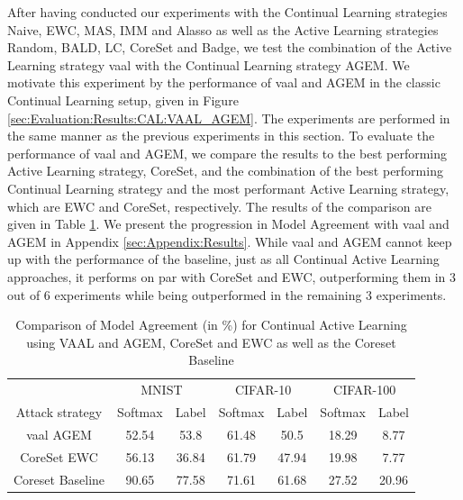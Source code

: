 After having conducted our experiments with the Continual Learning strategies Naive, EWC, MAS, IMM and Alasso as well as the Active Learning strategies
Random, BALD, LC, CoreSet and Badge, we test the combination of the Active Learning strategy \gls{vaal} with the Continual Learning strategy AGEM. We motivate
this experiment by the performance of \gls{vaal} and AGEM in the classic Continual Learning setup, given in Figure \ref{sec:Evaluation:Results:CAL:VAAL_AGEM}.
The experiments are performed in the same manner as the previous experiments in this section. To evaluate the performance of \gls{vaal} and AGEM, we compare
the results to the best performing Active Learning strategy, CoreSet, and the combination of the best performing Continual Learning strategy and the
most performant Active Learning strategy, which are EWC and CoreSet, respectively. The results of the comparison are given in Table 
\ref{fig:ModelStealingVAAL_AGEM}. We present the progression in Model Agreement with \gls{vaal} and AGEM in Appendix \ref{sec:Appendix:Results}. While \gls{vaal}
and AGEM cannot keep up with the performance of the baseline, just as all Continual Active Learning approaches, it performs on par with CoreSet and EWC,
outperforming them in 3 out of 6 experiments while being outperformed in the remaining 3 experiments. \par
\begin{table}[h]
    \centering
    \begin{tabular}{c c c c c c c} 
        \hline
        & \multicolumn{2}{c}{MNIST} & \multicolumn{2}{c}{CIFAR-10} & \multicolumn{2}{c}{CIFAR-100} \\ 
        \cline{2-7} Attack strategy & Softmax & Label & Softmax & Label & Softmax & Label \\
        \hline 
        \gls{vaal} AGEM & 52.54 & 53.8 & 61.48 & 50.5 & 18.29 & 8.77\\
        CoreSet EWC & 56.13 & 36.84 & 61.79 & 47.94 & 19.98 & 7.77 \\
        Coreset Baseline & 90.65 & 77.58 & 71.61 & 61.68 & 27.52 & 20.96\\
        \hline
    \end{tabular}
    \caption{Comparison of Model Agreement (in \%) for Continual Active Learning using VAAL and AGEM, CoreSet and EWC as well as the Coreset Baseline}
    \label{fig:ModelStealingVAAL_AGEM}
\end{table}

